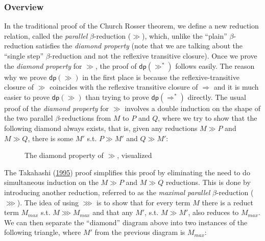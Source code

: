 \documentclass[a4paper, 12pt, twoside]{style/ociamthesis}
\theoremstyle{plain}
\theoremstyle{definition}
\theoremstyle{remark}
\newcommand{\dip}{\textsf{dp}}
\begin{document}
\subsubsection{Overview}\label{overview}

In the traditional proof of the Church Rosser theorem, we define a new
reduction relation, called the \emph{parallel} \(\beta\)-reduction
(\(\gg\)), which, unlike the ``plain'' \(\beta\)-reduction satisfies the
\emph{diamond property} (note that we are talking about the ``single
step'' \(\beta\)-reduction and not the reflexive transitive closure).
Once we prove the \emph{diamond property} for \(\gg\), the proof of
\(\dip(\gg^*)\) follows easily. The reason why we prove \(\dip(\gg)\) in
the first place is because the reflexive-transitive closure of \(\gg\)
coincides with the reflexive transitive closure of \(\Rightarrow\) and
it is much easier to prove \(\dip(\gg)\) than trying to prove
\(\dip(\Rightarrow^*)\) directly. The usual proof of the \emph{diamond
property} for \(\gg\) involves a double induction on the shape of the
two parallel \(\beta\)-reductions from \(M\) to \(P\) and \(Q\), where
we try to show that the following diamond always exists, that is, given
any reductions \(M \gg P\) and \(M \gg Q\), there is some \(M'\) s.t.
\(P \gg M'\) and \(Q \gg M'\):

\begin{figure}[h]
\begin{center}
\end{center}
\caption{The diamond property of $\gg$, visualized}
\end{figure}

The Takahashi (\protect\hyperlink{ref-takahashi95}{1995}) proof
simplifies this proof by eliminating the need to do simultaneous
induction on the \(M \gg P\) and \(M \gg Q\) reductions. This is done by
introducing another reduction, referred to as the \emph{maximal
parallel} \(\beta\)-reduction (\(\ggg\)). The idea of using \(\ggg\) is
to show that for every term \(M\) there is a reduct term \(M_{max}\)
s.t. \(M \ggg M_{max}\) and that any \(M'\), s.t. \(M \gg M'\), also
reduces to \(M_{max}\). We can then separate the ``diamond'' diagram
above into two instances of the following triangle, where \(M'\) from
the previous diagram is \(M_{max}\):
\end{document}
